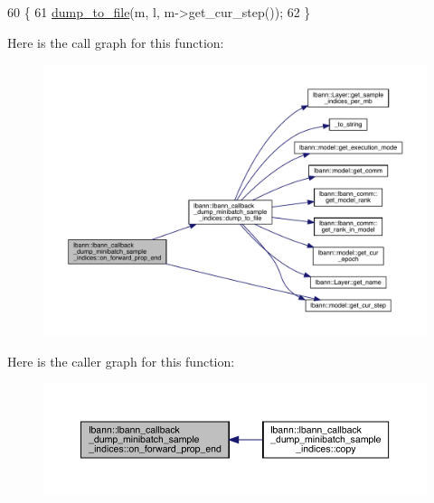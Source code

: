 \begin{DoxyCode}
60                                                                                          \{
61   \hyperlink{classlbann_1_1lbann__callback__dump__minibatch__sample__indices_a34d4564309168b3ab0b2e3092e2f9355}{dump\_to\_file}(m, l, m->get\_cur\_step());
62 \}
\end{DoxyCode}
Here is the call graph for this function\+:\nopagebreak
\begin{figure}[H]
\begin{center}
\leavevmode
\includegraphics[width=350pt]{classlbann_1_1lbann__callback__dump__minibatch__sample__indices_ac1a1359c0016eb0bcbdb767fc57e9154_cgraph}
\end{center}
\end{figure}
Here is the caller graph for this function\+:\nopagebreak
\begin{figure}[H]
\begin{center}
\leavevmode
\includegraphics[width=350pt]{classlbann_1_1lbann__callback__dump__minibatch__sample__indices_ac1a1359c0016eb0bcbdb767fc57e9154_icgraph}
\end{center}
\end{figure}
\mbox{\label{classlbann_1_1lbann__callback__dump__minibatch__sample__indices_aa1db9d6cef232a868110d72e4bc2477a}} 
